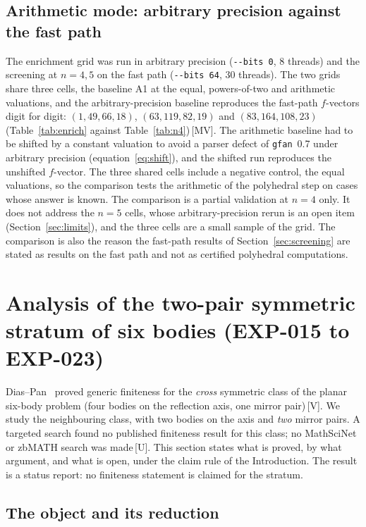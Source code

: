 \documentclass[11pt]{article}
\theoremstyle{definition}
\theoremstyle{remark}
\newcommand{\mk}[1]{\,{\scriptsize[#1]}}
\newcommand{\MV}{\mk{MV}}
\newcommand{\Vm}{\mk{V}}
\newcommand{\Um}{\mk{U}}
\begin{document}
\subsection{Arithmetic mode: arbitrary precision against the fast path}\label{sec:ablation-bits}

The enrichment grid was run in arbitrary precision (\texttt{-{}-bits 0}, 8 threads) and the screening at $n=4,5$ on the fast path (\texttt{-{}-bits 64}, 30 threads). The two grids share three
cells, the baseline A1 at the equal, powers-of-two and arithmetic valuations, and the arbitrary-precision baseline reproduces the fast-path $f$-vectors digit for digit:
$(1,49,66,18)$, $(63,119,82,19)$ and $(83,164,108,23)$ (Table~\ref{tab:enrich} against Table~\ref{tab:n4})\MV. The arithmetic baseline had to be shifted by a constant valuation to avoid a parser
defect of \texttt{gfan}~0.7 under arbitrary precision (equation~\eqref{eq:shift}), and the shifted run reproduces the unshifted $f$-vector. The three shared cells include a negative control, the equal valuations, so the comparison tests the arithmetic of the polyhedral step on cases whose answer is known. The comparison is a partial validation at $n=4$ only. It does
not address the $n=5$ cells, whose arbitrary-precision rerun is an open item (Section~\ref{sec:limits}), and the three cells are a small sample of the grid. The comparison is also the reason the fast-path
results of Section~\ref{sec:screening} are stated as results on the fast path and not as certified polyhedral computations.

\section{Analysis of the two-pair symmetric stratum of six bodies (EXP-015 to EXP-023)}\label{sec:stratum}

Dias--Pan~\cite{DP18} proved generic finiteness for the \emph{cross} symmetric
class of the planar six-body problem (four bodies on the reflection axis, one
mirror pair)\Vm. We study the neighbouring class, with two bodies on the axis
and \emph{two} mirror pairs. A targeted search found no published
finiteness result for this class; no MathSciNet or zbMATH search was made\Um.
This section states what is proved, by what argument, and what is open, under the claim rule
of the Introduction. The result is a status report: no finiteness statement is claimed for the stratum.

\subsection{The object and its reduction}
\end{document}
